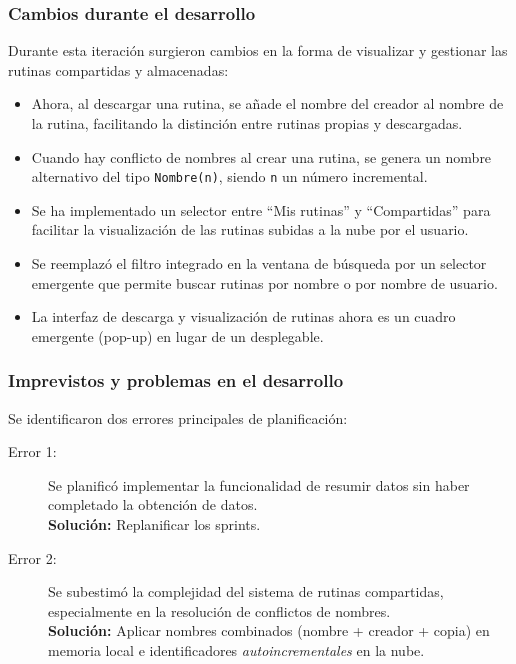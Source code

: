 \subsubsection{Cambios durante el desarrollo}
Durante esta iteraci\'on surgieron cambios en la forma de visualizar y gestionar las rutinas compartidas y almacenadas:

\begin{itemize}
  \item Ahora, al descargar una rutina, se a\~nade el nombre del creador al nombre de la rutina, facilitando la distinci\'on entre rutinas propias y descargadas.
  \item Cuando hay conflicto de nombres al crear una rutina, se genera un nombre alternativo del tipo \texttt{Nombre(n)}, siendo \texttt{n} un n\'umero incremental.
  \item Se ha implementado un selector entre ``Mis rutinas'' y ``Compartidas'' para facilitar la visualizaci\'on de las rutinas subidas a la nube por el usuario.
  \item Se reemplaz\'o el filtro integrado en la ventana de b\'usqueda por un selector emergente que permite buscar rutinas por nombre o por nombre de usuario.
  \item La interfaz de descarga y visualizaci\'on de rutinas ahora es un cuadro emergente (pop-up) en lugar de un desplegable.
\end{itemize}

\subsubsection{Imprevistos y problemas en el desarrollo}
Se identificaron dos errores principales de planificaci\'on:

\begin{description}
  \item[Error 1:] Se planific\'o implementar la funcionalidad de resumir datos sin haber completado la obtenci\'on de datos. \\ \textbf{Soluci\'on:} Replanificar los sprints.
  \item[Error 2:] Se subestim\'o la complejidad del sistema de rutinas compartidas, especialmente en la resoluci\'on de conflictos de nombres. \\ \textbf{Soluci\'on:} Aplicar nombres combinados (nombre + creador + copia) en memoria local e identificadores \textit{autoincrementales} en la nube.
\end{description}

